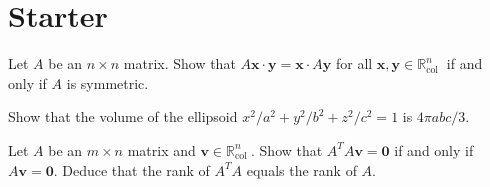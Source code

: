 \documentclass[answers]{exam}
\begin{document}
\section*{Starter}
\begin{questions}

\question%
Let $A$ be an $n \times n$ matrix. Show that $A \mathbf{x} \cdot \mathbf{y}=\mathbf{x} \cdot A \mathbf{y}$ for all $\mathbf{x}, \mathbf{y} \in \mathbb{R}_{\text {col }}^{n}$ if and only if $A$ is symmetric.



\question%
Show that the volume of the ellipsoid $x^{2} / a^{2}+y^{2} / b^{2}+z^{2} / c^{2}=1$ is $4 \pi a b c / 3$.



\question%
Let $A$ be an $m \times n$ matrix and $\mathbf{v} \in \mathbb{R}_{\text {col }}^{n}$. Show that $A^{T} A \mathbf{v}=\mathbf{0}$ if and only if $A \mathbf{v}=\mathbf{0}$. Deduce that the rank of $A^{T} A$ equals the rank of $A$.

\end{questions}
\end{document}

